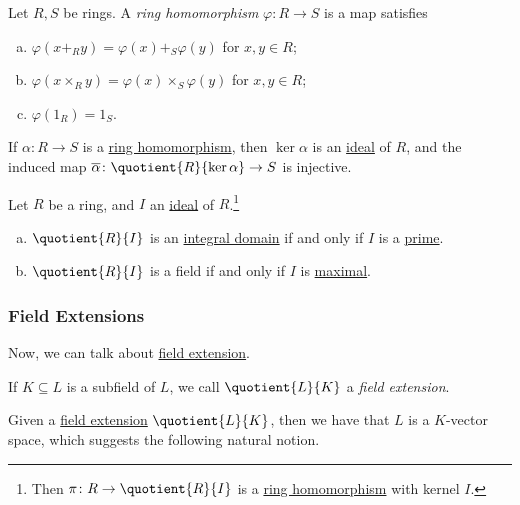 \begin{prev}\label{prev:ring-homomorphism}
	Let \(R, S\) be rings. A \emph{ring homomorphism} \(\varphi \colon R \to S\) is a map satisfies
	\begin{enumerate}[(a)]
		\item \(\varphi (x +_R y) = \varphi (x) +_S \varphi (y)\) for \(x, y\in R\);
		\item \(\varphi (x \times_R y) = \varphi (x) \times_S \varphi (y)\) for \(x, y\in R\);
		\item \(\varphi (1_R) = 1_S\).
	\end{enumerate}
\end{prev}

\begin{theorem}
	If \(\alpha \colon R \to S\) is a \hyperref[prev:ring-homomorphism]{ring homomorphism}, then \(\ker \alpha \) is an \hyperref[def:ideal]{ideal} of \(R\), and the induced map \(\overline{\alpha} \colon \quotient{R}{\ker \alpha } \to S\) is injective.
\end{theorem}

\begin{theorem}
	Let \(R\) be a ring, and \(I\) an \hyperref[def:ideal]{ideal} of \(R\).\footnote{Then \(\pi \colon R \to \quotient{R}{I} \) is a \hyperref[prev:ring-homomorphism]{ring homomorphism} with kernel \(I\).}
	\begin{enumerate}[(a)]
		\item \(\quotient{R}{I} \) is an \hyperref[def:integral-domain]{integral domain} if and only if \(I\) is a \hyperref[def:prime]{prime}.
		\item \(\quotient{R}{I} \) is a field if and only if \(I\) is \hyperref[def:proper-ideal-maximal]{maximal}.
	\end{enumerate}
\end{theorem}

\subsubsection{Field Extensions}
Now, we can talk about \hyperref[def:field-extension]{field extension}.

\begin{definition}\label{def:field-extension}
	If \(K \subseteq L\) is a subfield of \(L\), we call \(\quotient{L}{K} \) a \emph{field extension}.
\end{definition}

Given a \hyperref[def:field-extension]{field extension} \(\quotient{L}{K} \), then we have that \(L\) is a \(K\)-vector space, which suggests the following natural notion.

